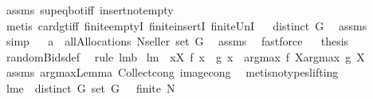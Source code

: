 \begin{isabellebody}
\ assms{\isacharparenleft}{}{\isacharparenright}\ sup{\isacharunderscore}eq{\isacharunderscore}bot{\isacharunderscore}iff\ insert{\isacharunderscore}not{\isacharunderscore}empty\isanewline
{}\isamarkupfalse%
\ {\isacharparenleft}metis\ card{\isacharunderscore}gt{\isacharunderscore}{}{\isacharunderscore}iff\ finite{\isachardot}emptyI\ finite{\isachardot}insertI\ finite{\isacharunderscore}UnI{\isacharparenright}\isanewline
{}\isamarkupfalse%
\ \isamarkupfalse%
\ {\isachardoublequoteopen}distinct\ G{\isachardoublequoteclose}\ \isamarkupfalse%
\ assms{\isacharparenleft}{}{\isacharparenright}\ \isamarkupfalse%
\ simp\isanewline
{}\isamarkupfalse%
\ \isamarkupfalse%
\ {\isachardoublequoteopen}a\ {\isasymin}\ allAllocations\ {\isacharparenleft}N{\isasymunion}{\isacharbraceleft}seller{\isacharbraceright}{\isacharparenright}\ {\isacharparenleft}set\ G{\isacharparenright}{\isachardoublequoteclose}\ \isamarkupfalse%
\ assms{\isacharparenleft}{}{\isacharparenright}\ \isamarkupfalse%
\ fastforce\isanewline
{}\isamarkupfalse%
\ \isamarkupfalse%
\ {\isacharquery}thesis\ \isamarkupfalse%
\ randomBids{\isacharunderscore}def\ \isamarkupfalse%
\ {\isacharparenleft}rule\ lm{}{}b{\isacharparenright}\isanewline
{}\isamarkupfalse%
%
\endisatagproof
{\isafoldproof}%
%
\isadelimproof
\isanewline
%
\endisadelimproof
\isanewline
{}\isamarkupfalse%
\ lm{}{}{\isacharcolon}\ \ {\isachardoublequoteopen}{\isasymforall}x{\isasymin}X{\isachardot}\ f\ x\ {\isacharequal}\ g\ x{\isachardoublequoteclose}\ \ {\isachardoublequoteopen}argmax\ f\ X{\isacharequal}argmax\ g\ X{\isachardoublequoteclose}\ \isanewline
%
\isadelimproof
%
\endisadelimproof
%
\isatagproof
{}\isamarkupfalse%
\ assms\ argmaxLemma\ Collect{\isacharunderscore}cong\ image{\isacharunderscore}cong\ \isanewline
{}\isamarkupfalse%
\ {\isacharparenleft}metis{\isacharparenleft}no{\isacharunderscore}types{\isacharcomma}lifting{\isacharparenright}{\isacharparenright}%
\endisatagproof
{\isafoldproof}%
%
\isadelimproof
\isanewline
%
\endisadelimproof
\isanewline
\isanewline
\isanewline
{}\isamarkupfalse%
\ lm{}{}e{\isacharcolon}\ \ {\isachardoublequoteopen}distinct\ G{\isachardoublequoteclose}\ {\isachardoublequoteopen}set\ G\ {\isasymnoteq}\ {\isacharbraceleft}{\isacharbraceright}{\isachardoublequoteclose}\ {\isachardoublequoteopen}finite\ N{\isachardoublequoteclose}\ \ \isanewline

\end{isabellebody}
